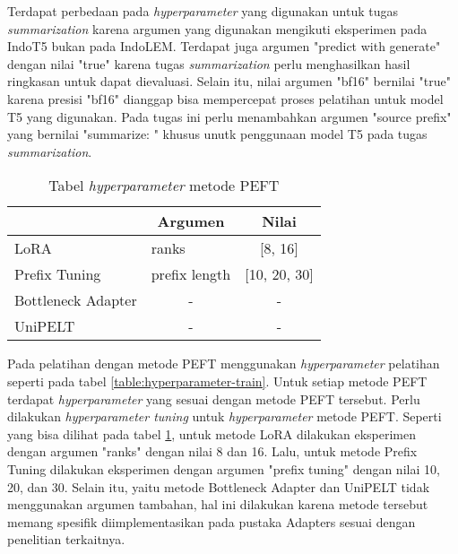 Terdapat perbedaan pada \textit{hyperparameter} yang digunakan untuk tugas \textit{summarization} karena argumen yang digunakan mengikuti eksperimen pada IndoT5 bukan pada IndoLEM. Terdapat juga argumen "predict with generate" dengan nilai "true" karena tugas \textit{summarization} perlu menghasilkan hasil ringkasan untuk dapat dievaluasi. Selain itu, nilai argumen "bf16" bernilai "true" karena presisi "bf16" dianggap bisa mempercepat proses pelatihan untuk model T5 yang digunakan. Pada tugas ini perlu menambahkan argumen "source prefix" yang bernilai "summarize: " khusus unutk penggunaan model T5 pada tugas \textit{summarization}.

\begin{table}[h]
    \centering
    \caption{Tabel \textit{hyperparameter} metode PEFT}
    \label{table:hyperparameter-PEFT}
    \begin{tabular}{|l|l|c|}
        \hline \rowcolor{black!10}
        \multicolumn{1}{|c|}{\textbf{Metode}} & \multicolumn{1}{|c|}{\textbf{Argumen}} & \textbf{Nilai} \\ \hline
        LoRA & ranks & [8, 16] \\ \hline
        Prefix Tuning & prefix length & [10, 20, 30] \\ \hline
        Bottleneck Adapter & \multicolumn{1}{|c|}{-} & - \\ \hline
        UniPELT & \multicolumn{1}{|c|}{-}  & - \\ \hline
    \end{tabular}
\end{table}

Pada pelatihan dengan metode PEFT  menggunakan \textit{hyperparameter} pelatihan seperti pada tabel \ref{table:hyperparameter-train}. Untuk setiap metode PEFT terdapat \textit{hyperparameter} yang sesuai dengan metode PEFT tersebut. Perlu dilakukan \textit{hyperparameter tuning} untuk \textit{hyperparameter} metode PEFT. Seperti yang bisa dilihat pada tabel \ref{table:hyperparameter-PEFT}, untuk metode LoRA dilakukan eksperimen dengan argumen "ranks" dengan nilai 8 dan 16. Lalu, untuk metode Prefix Tuning dilakukan eksperimen dengan argumen "prefix tuning" dengan nilai 10, 20, dan 30. Selain itu, yaitu metode Bottleneck Adapter dan UniPELT tidak menggunakan argumen tambahan, hal ini dilakukan karena metode tersebut memang spesifik diimplementasikan pada pustaka Adapters sesuai dengan penelitian terkaitnya.
